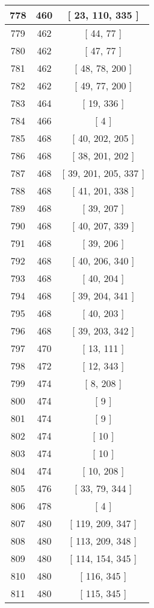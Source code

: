 \begin{center}
\begin{longtable}[H]{|| c c c ||}
\hline
778 & 460 & [ 23, 110, 335 ] \\ 
\hline
779 & 462 & [ 44, 77 ] \\ 
\hline
780 & 462 & [ 47, 77 ] \\ 
\hline
781 & 462 & [ 48, 78, 200 ] \\ 
\hline
782 & 462 & [ 49, 77, 200 ] \\ 
\hline
783 & 464 & [ 19, 336 ] \\ 
\hline
784 & 466 & [ 4 ] \\ 
\hline
785 & 468 & [ 40, 202, 205 ] \\ 
\hline
786 & 468 & [ 38, 201, 202 ] \\ 
\hline
787 & 468 & [ 39, 201, 205, 337 ] \\ 
\hline
788 & 468 & [ 41, 201, 338 ] \\ 
\hline
789 & 468 & [ 39, 207 ] \\ 
\hline
790 & 468 & [ 40, 207, 339 ] \\ 
\hline
791 & 468 & [ 39, 206 ] \\ 
\hline
792 & 468 & [ 40, 206, 340 ] \\ 
\hline
793 & 468 & [ 40, 204 ] \\ 
\hline
794 & 468 & [ 39, 204, 341 ] \\ 
\hline
795 & 468 & [ 40, 203 ] \\ 
\hline
796 & 468 & [ 39, 203, 342 ] \\ 
\hline
797 & 470 & [ 13, 111 ] \\ 
\hline
798 & 472 & [ 12, 343 ] \\ 
\hline
799 & 474 & [ 8, 208 ] \\ 
\hline
800 & 474 & [ 9 ] \\ 
\hline
801 & 474 & [ 9 ] \\ 
\hline
802 & 474 & [ 10 ] \\ 
\hline
803 & 474 & [ 10 ] \\ 
\hline
804 & 474 & [ 10, 208 ] \\ 
\hline
805 & 476 & [ 33, 79, 344 ] \\ 
\hline
806 & 478 & [ 4 ] \\ 
\hline
807 & 480 & [ 119, 209, 347 ] \\ 
\hline
808 & 480 & [ 113, 209, 348 ] \\ 
\hline
809 & 480 & [ 114, 154, 345 ] \\ 
\hline
810 & 480 & [ 116, 345 ] \\ 
\hline
811 & 480 & [ 115, 345 ] \\ 
\hline

\end{longtable}
\end{center}
